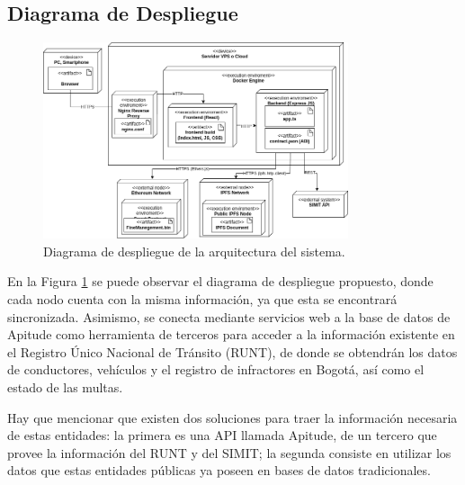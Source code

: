  \subsection{ Diagrama de Despliegue }
\begin{figure}[htbp]
    \centering
    \includegraphics[width=0.8\textwidth]{Images/Despliegue.png}
    \caption{Diagrama de despliegue de la arquitectura del sistema.}
    \label{fig:diagrama_despliegue}
\end{figure}
En la Figura \ref{fig:diagrama_despliegue} se puede observar el diagrama de despliegue propuesto, donde cada nodo cuenta con la misma información, ya que esta se encontrará sincronizada. Asimismo, se conecta mediante servicios web a la base de datos de Apitude como herramienta de terceros para acceder a la información existente en el Registro Único Nacional de Tránsito (RUNT), de donde se obtendrán los datos de conductores, vehículos y el registro de infractores en Bogotá, así como el estado de las multas.

Hay que mencionar que existen dos soluciones para traer la información necesaria de estas entidades: la primera es una API llamada Apitude, de un tercero que provee la información del RUNT y del SIMIT; la segunda consiste en utilizar los datos que estas entidades públicas ya poseen en bases de datos tradicionales. 

